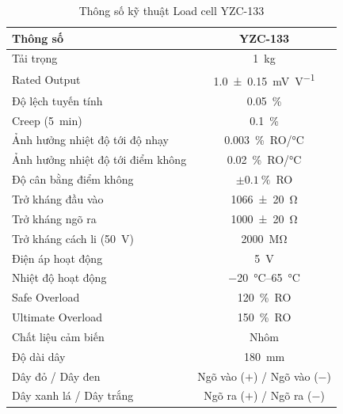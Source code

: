 \begin{table}[H]
    \centering
    \caption{Thông số kỹ thuật Load cell YZC-133}
    \label{tab:c3:thong-so-loadcell}
    \renewcommand{\arraystretch}{1.3}
    \begin{tabular}{|l|c|}
        \hline
        \textbf{Thông số} & \textbf{YZC-133} \\ \hline
        Tải trọng                                        & \qty{1}{\kilo\gram} \\ \hline
        Rated Output                                     & \qty{1.0 \pm 0.15}{\milli\volt\per\volt} \\ \hline
        Độ lệch tuyến tính                               & \qty{0.05}{\percent} \\ \hline
        Creep (\qty{5}{\minute})                         & \qty{0.1}{\percent} \\ \hline
        Ảnh hưởng nhiệt độ tới độ nhạy                   & \qty{0.003}{\percent}~RO/\unit{\celsius} \\ \hline
        Ảnh hưởng nhiệt độ tới điểm không                & \qty{0.02}{\percent}~RO/\unit{\celsius} \\ \hline
        Độ cân bằng điểm không                           & $\pm\qty{0.1}{\percent}$~RO \\ \hline
        Trở kháng đầu vào                                & \qty{1066 \pm 20}{\ohm} \\ \hline
        Trở kháng ngõ ra                                 & \qty{1000 \pm 20}{\ohm} \\ \hline
        Trở kháng cách li (\qty{50}{\volt})              & \qty{2000}{\mega\ohm} \\ \hline
        Điện áp hoạt động                                & \qty{5}{\volt} \\ \hline
        Nhiệt độ hoạt động                               & \qtyrange{-20}{65}{\celsius} \\ \hline
        Safe Overload                                    & \qty{120}{\percent}~RO \\ \hline
        Ultimate Overload                                & \qty{150}{\percent}~RO \\ \hline
        Chất liệu cảm biến                               & Nhôm \\ \hline
        Độ dài dây                                       & \qty{180}{\milli\meter} \\ \hline
        Dây đỏ / Dây đen                                 & Ngõ vào ($+$) / Ngõ vào ($-$) \\ \hline
        Dây xanh lá / Dây trắng                          & Ngõ ra ($+$) / Ngõ ra ($-$) \\ \hline
    \end{tabular}
\end{table}

